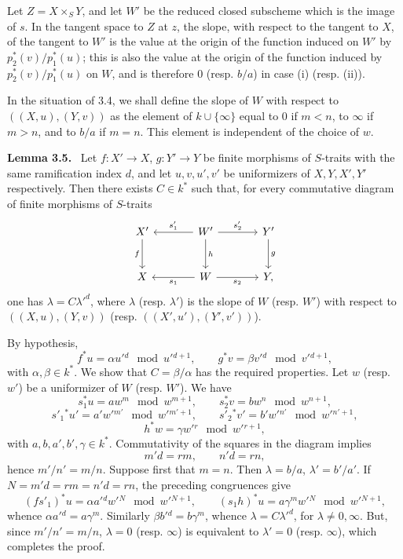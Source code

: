 \documentclass[11pt]{article}
\newenvironment{statement}[1]{\par\medskip\noindent\textbf{#1.}\ }{\par\medskip}
\begin{document}
Let $Z=X\times_SY$, and let $W'$ be the reduced closed subscheme which is the image of $s$. In the tangent space to $Z$ at $z$, the slope, with respect to the tangent to $X$, of the tangent to $W'$ is the value at the origin of the function induced on $W'$ by $p_2^*(v)/p_1^*(u)$; this is also the value at the origin of the function induced by $p_2^*(v)/p_1^*(u)$ on $W$, and is therefore $0$ (resp. $b/a$) in case (i) (resp. (ii)).

In the situation of 3.4, we shall define the slope of $W$ with respect to $((X,u),(Y,v))$ as the element of $k\cup\{\infty\}$ equal to $0$ if $m<n$, to $\infty$ if $m>n$, and to $b/a$ if $m=n$. This element is independent of the choice of $w$.

\begin{statement}{Lemma 3.5}
Let $f:X'\to X$, $g:Y'\to Y$ be finite morphisms of $S$-traits with the same ramification index $d$, and let $u,v,u',v'$ be uniformizers of $X,Y,X',Y'$ respectively. Then there exists $C\in k^*$ such that, for every commutative diagram of finite morphisms of $S$-traits
\[
\begin{tikzcd}[column sep=large,row sep=large]
X' \arrow[d,"f"'] & W' \arrow[l,"s'_1"'] \arrow[r,"s'_2"] \arrow[d,"h"] & Y' \arrow[d,"g"]\\
X & W \arrow[l,"s_1"] \arrow[r,"s_2"'] & Y ,
\end{tikzcd}
\]
one has $\lambda=C{\lambda'}^d$, where $\lambda$ (resp. $\lambda'$) is the slope of $W$ (resp. $W'$) with respect to $((X,u),(Y,v))$ (resp. $((X',u'),(Y',v'))$).
\end{statement}

By hypothesis,
\[
f^*u=\alpha u'{}^d\mod {u'{}^{d+1}},\qquad
g^*v=\beta v'{}^d\mod {v'{}^{d+1}},
\]
with $\alpha,\beta\in k^*$. We show that $C=\beta/\alpha$ has the required properties. Let $w$ (resp. $w'$) be a uniformizer of $W$ (resp. $W'$). We have
\[
s_1^*u=aw^m\mod {w^{m+1}},\qquad
s_2^*v=bw^n\mod {w^{n+1}},
\]
\[
s'_1{}^*u'=a'w'{}^{m'}\mod {w'{}^{m'+1}},\qquad
s'_2{}^*v'=b'w'{}^{n'}\mod {w'{}^{n'+1}},
\]
\[
h^*w=\gamma w'{}^r\mod {w'{}^{r+1}},
\]
with $a,b,a',b',\gamma\in k^*$. Commutativity of the squares in the diagram implies
\[
m'd=rm,\qquad n'd=rn,
\]
hence $m'/n'=m/n$. Suppose first that $m=n$. Then $\lambda=b/a$, $\lambda'=b'/a'$. If $N=m'd=rm=n'd=rn$, the preceding congruences give
\[
(fs'_1)^*u=\alpha a'{}^d w'{}^N\mod {w'{}^{N+1}},\qquad
(s_1h)^*u=a\gamma^m w'{}^N\mod {w'{}^{N+1}},
\]
whence $\alpha a'{}^d=a\gamma^m$. Similarly $\beta b'{}^d=b\gamma^m$, whence $\lambda=C{\lambda'}^d$, for $\lambda\ne0,\infty$. But, since $m'/n'=m/n$, $\lambda=0$ (resp. $\infty$) is equivalent to $\lambda'=0$ (resp. $\infty$), which completes the proof.
\end{document}
